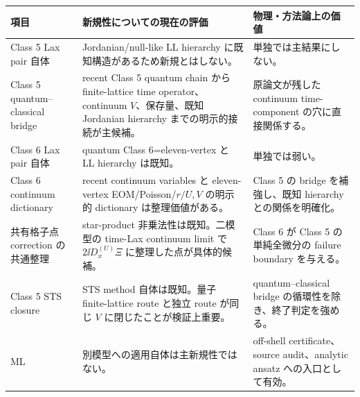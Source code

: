 \begin{longtable}{L{42mm}L{48mm}L{48mm}}
\toprule
項目 & 新規性についての現在の評価 & 物理・方法論上の価値\\
\midrule\endhead
Class 5 Lax pair 自体 & Jordanian/null-like LL hierarchy に既知構造があるため新規とはしない。 & 単独では主結果にしない。\\
Class 5 quantum--classical bridge & recent Class 5 quantum chain から finite-lattice time operator、continuum $V$、保存量、既知 Jordanian hierarchy までの明示的接続が主候補。 & 原論文が残した continuum time-component の穴に直接関係する。\\
Class 6 Lax pair 自体 & quantum Class 6=eleven-vertex と LL hierarchy は既知。 & 単独では弱い。\\
Class 6 continuum dictionary & recent continuum variables と eleven-vertex EOM/Poisson/$r/U,V$ の明示的 dictionary は整理価値がある。 & Class 5 の bridge を補強し、既知 hierarchy との関係を明確化。\\
共有格子点 correction の共通整理 & star-product 非乗法性は既知。二模型の time-Lax continuum limit で $2\ii D_x^{(U)}\Xi$ に整理した点が具体的候補。 & Class 6 が Class 5 の単純全微分の failure boundary を与える。\\
Class 5 STS closure & STS method 自体は既知。量子 finite-lattice route と独立 route が同じ $V$ に閉じたことが検証上重要。 & quantum--classical bridge の循環性を除き、終了判定を強める。\\
ML & 別模型への適用自体は主新規性ではない。 & off-shell certificate、source audit、analytic ansatz への入口として有効。\\
\bottomrule
\end{longtable}

